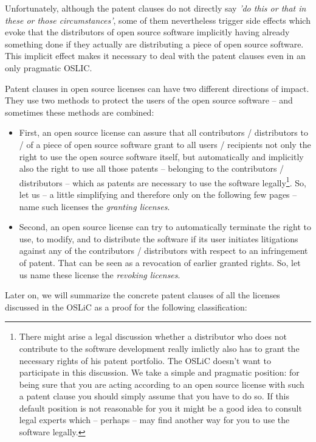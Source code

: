 Unfortunately, although the patent clauses do not directly say \emph{'do this or
that in these or those circumstances'}, some of them nevertheless trigger side
effects which evoke that the distributors of open source software implicitly
having already something done if they actually are distributing a piece of open
source software. This implicit effect makes it necessary to deal with the patent
clauses even in an only pragmatic OSLIC.

Patent clauses in open source licenses can have two different directions of
impact. They use two methods to protect the users of the open source software --
and sometimes these methods are combined:

\begin{itemize}
  \item First, an open source license can assure that all contributors /
  distributors to / of a piece of open source software grant to all users /
  recipients not only the right to use the open source software itself, but
  automatically and implicitly also the right to use all those patents --
  belonging to the contributors / distributors -- which as patents are necessary
  to use the software legally\footnote{There might arise a legal discussion
  whether a distributor who does not contribute to the software development
  really imlictly also has to grant the necessary rights of his patent
  portfolio. The OSLiC doesn't want to participate in this discussion. We take a
  simple and pragmatic position: for being sure that you are acting according to
  an open source license with such a patent clause you should simply assume that
  you have to do so. If this default position is not reasonable for you it might
  be a good idea to consult legal experts which -- perhaps -- may find another
  way for you to use the software legally.}. So, let us -- a little simplifying
  and therefore only on the following few pages -- name such licenses the
  \emph{granting licenses}.
  \item Second, an open source license can try to automatically terminate the
  right to use, to modify, and to distribute the software if its user initiates
  litigations against any of the contributors / distributors with respect to an
  infringement of patent. That can be seen as a revocation of earlier granted
  rights. So, let us name these license the \emph{revoking licenses}.
\end{itemize}

Later on, we will summarize the concrete patent clauses of all the licenses
discussed in the OSLiC as a proof for the following classification:

